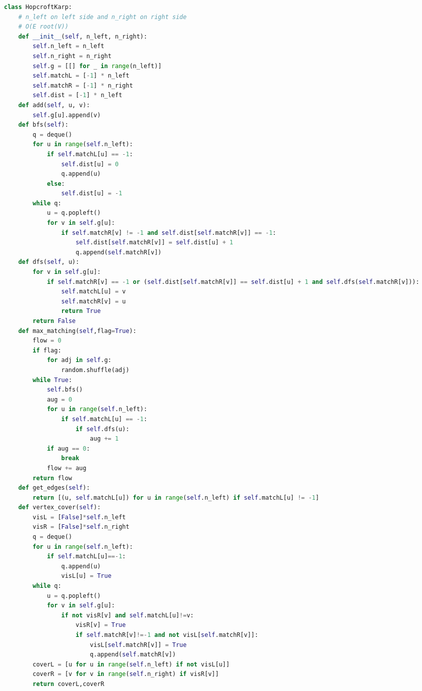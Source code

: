 \documentclass[10pt,landscape, a4paper]{article}
\begin{document}
\begin{multicols*}{3}
\begin{lstlisting}[language=Python]
class HopcroftKarp:
    # n_left on left side and n_right on right side
    # O(E root(V))
    def __init__(self, n_left, n_right):
        self.n_left = n_left
        self.n_right = n_right
        self.g = [[] for _ in range(n_left)]
        self.matchL = [-1] * n_left
        self.matchR = [-1] * n_right
        self.dist = [-1] * n_left
    def add(self, u, v):
        self.g[u].append(v)
    def bfs(self):
        q = deque()
        for u in range(self.n_left):
            if self.matchL[u] == -1:
                self.dist[u] = 0
                q.append(u)
            else:
                self.dist[u] = -1
        while q:
            u = q.popleft()
            for v in self.g[u]:
                if self.matchR[v] != -1 and self.dist[self.matchR[v]] == -1:
                    self.dist[self.matchR[v]] = self.dist[u] + 1
                    q.append(self.matchR[v])
    def dfs(self, u):
        for v in self.g[u]:
            if self.matchR[v] == -1 or (self.dist[self.matchR[v]] == self.dist[u] + 1 and self.dfs(self.matchR[v])):
                self.matchL[u] = v
                self.matchR[v] = u
                return True
        return False
    def max_matching(self,flag=True):
        flow = 0
        if flag:
            for adj in self.g:
                random.shuffle(adj)
        while True:
            self.bfs()
            aug = 0
            for u in range(self.n_left):
                if self.matchL[u] == -1:
                    if self.dfs(u):
                        aug += 1
            if aug == 0:
                break
            flow += aug
        return flow
    def get_edges(self):
        return [(u, self.matchL[u]) for u in range(self.n_left) if self.matchL[u] != -1]
    def vertex_cover(self):
        visL = [False]*self.n_left
        visR = [False]*self.n_right
        q = deque()
        for u in range(self.n_left):
            if self.matchL[u]==-1:
                q.append(u)
                visL[u] = True
        while q:
            u = q.popleft()
            for v in self.g[u]:
                if not visR[v] and self.matchL[u]!=v:
                    visR[v] = True
                    if self.matchR[v]!=-1 and not visL[self.matchR[v]]:
                        visL[self.matchR[v]] = True
                        q.append(self.matchR[v])
        coverL = [u for u in range(self.n_left) if not visL[u]]
        coverR = [v for v in range(self.n_right) if visR[v]]
        return coverL,coverR
\end{lstlisting}


\end{multicols*}
\end{document}
